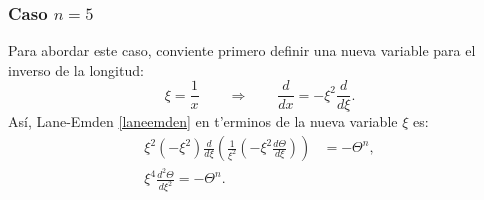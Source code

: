 \subsubsection{Caso \texorpdfstring{$n=5$}{n5}}\label{sec:exactas-n5}
Para abordar este caso, conviente primero definir una nueva variable para el inverso de la longitud:
\begin{equation}\label{lane5cambio}
 \xi=\frac{1}{x}\qquad\Rightarrow\qquad \frac{d}{d x}=-\xi^2\frac{d}{d\xi}.
\end{equation}
As\'i, Lane-Emden \eqref{laneemden} en t'erminos de la nueva variable $\xi$ es:
\begin{align}
\xi^2(-\xi^2)\frac{d}{d\xi}\left(\frac{1}{\xi^2}(-\xi^2\frac{d\Theta}{d\xi})\right)&=-\Theta^n, \\
\xi^4\frac{d^2\Theta}{d\xi^2}=-\Theta^n.\label{transkelvin}
\end{align}
